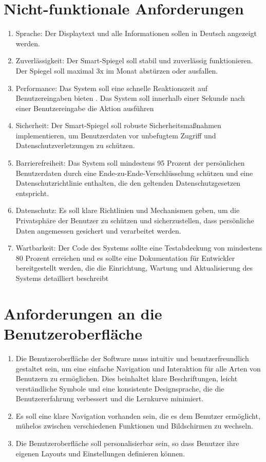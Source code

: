 \documentclass{article}
\begin{document}
\section{Nicht-funktionale Anforderungen}
\begin{enumerate}[label=\textbf{NFA\arabic*:}]
    \item Sprache: Der Displaytext und alle Informationen sollen in Deutsch angezeigt werden.
    \item Zuverlässigkeit: Der Smart-Spiegel soll stabil und zuverlässig funktionieren. Der Spiegel soll maximal 3x im Monat abstürzen oder ausfallen.
    \item Performance: Das System soll eine schnelle Reaktionszeit auf Benutzereingaben bieten . Das System soll innerhalb einer Sekunde nach einer Benutzereingabe die Aktion ausführen
    \item Sicherheit: Der Smart-Spiegel soll robuste Sicherheitsmaßnahmen implementieren, um Benutzerdaten vor unbefugtem Zugriff und Datenschutzverletzungen zu schützen.
    \item Barrierefreiheit: Das System soll mindestens 95 Prozent der persönlichen Benutzerdaten durch eine Ende-zu-Ende-Verschlüsselung schützen und eine Datenschutzrichtlinie enthalten, die den geltenden Datenschutzgesetzen entspricht.
    \item Datenschutz: Es soll klare Richtlinien und Mechanismen geben, um die Privatsphäre der Benutzer zu schützen und sicherzustellen, dass persönliche Daten angemessen gesichert und verarbeitet werden.
    \item Wartbarkeit: Der Code des Systems sollte eine Testabdeckung von mindestens 80 Prozent erreichen und es sollte eine Dokumentation für Entwickler bereitgestellt werden, die die Einrichtung, Wartung und Aktualisierung des Systems detailliert beschreibt
\end{enumerate}

\section{Anforderungen an die Benutzeroberfläche}
\begin{enumerate}[label=\textbf{B\arabic*:}]
    \item Die Benutzeroberfläche der Software muss intuitiv und benutzerfreundlich gestaltet sein, um eine einfache Navigation und Interaktion für alle Arten von Benutzern zu ermöglichen. Dies beinhaltet klare Beschriftungen, leicht verständliche Symbole und eine konsistente Designsprache, die die Benutzererfahrung verbessert und die Lernkurve minimiert.
    \item Es soll eine klare Navigation vorhanden sein, die es dem Benutzer ermöglicht, mühelos zwischen verschiedenen Funktionen und Bildschirmen zu wechseln. 
    \item Die Benutzeroberfläche soll personalisierbar sein, so dass Benutzer ihre eigenen Layouts und Einstellungen definieren können.
\end{enumerate}
\end{document}

